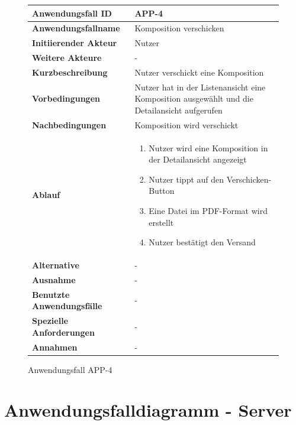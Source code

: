 \begin{figure}[h]
	\centering
	\begin{tabularx}{\textwidth}{ X | X }
		\textbf{Anwendungsfall ID} & APP-4 \\ \hline
		\textbf{Anwendungsfallname} & Komposition verschicken \\ \hline
		\textbf{Initiierender Akteur} & Nutzer
		 \\ \hline
		\textbf{Weitere Akteure} & -  \\ \hline
		\textbf{Kurzbeschreibung} & Nutzer verschickt eine Komposition  \\ \hline
		\textbf{Vorbedingungen} & Nutzer hat in der Listenansicht eine Komposition ausgewählt und die Detailansicht aufgerufen  \\ \hline
		\textbf{Nachbedingungen} & Komposition wird verschickt  \\ \hline
		\textbf{Ablauf} &
		\begin{enumerate}
			\item Nutzer wird eine Komposition in der Detailansicht angezeigt
			\item Nutzer tippt auf den Verschicken-Button
			\item Eine Datei im PDF-Format wird erstellt
			\item Nutzer bestätigt den Versand
		\end{enumerate} \\ \hline
		\textbf{Alternative} &
		-  \\ \hline
		\textbf{Ausnahme} &
		- \\ \hline
		\textbf{Benutzte Anwendungsfälle} & - \\ \hline
		\textbf{Spezielle Anforderungen} & - \\ \hline
		\textbf{Annahmen} & -
	\end{tabularx}
	\caption{Anwendungsfall APP-4}
	\label{fig:anwendungsfall-app-tabelle-APP-4}
\end{figure}

\newpage


\section{Anwendungsfalldiagramm - Server}

